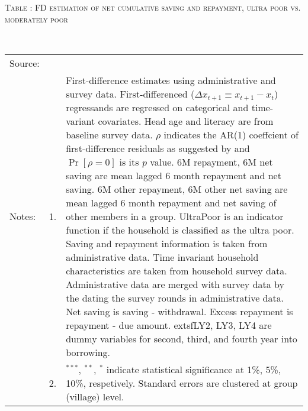 \hspace{-1cm}\begin{minipage}[t]{14cm}
\hfil\textsc{\normalsize Table \thetable: FD estimation of net cumulative saving and repayment, ultra poor vs. moderately poor\label{tab FD saving2 original HH}}\\
\setlength{\tabcolsep}{1pt}
\setlength{\baselineskip}{8pt}
\renewcommand{\arraystretch}{.55}
\hspace{-.75cm}\\
\renewcommand{\arraystretch}{.8}
\setlength{\tabcolsep}{1pt}
\begin{tabular}{>{\hfill\scriptsize}p{1cm}<{}>{\hfill\scriptsize}p{.25cm}<{}>{\scriptsize}p{12cm}<{\hfill}}
Source:& \multicolumn{2}{l}{\scriptsize Estimated with GUK administrative and survey data.}\\
Notes: & 1. & First-difference estimates using administrative and survey data. First-differenced ($\Delta x_{t+1}\equiv x_{t+1} - x_{t}$) regressands are regressed on categorical and time-variant covariates. Head age and literacy are from baseline survey data. $\rho$ indicates the AR(1) coeffcient of first-difference residuals as suggested by \citet[][10.71]{Wooldridge2010} and $\Pr[\rho=0]$ is its $p$ value. \textsf{6M repayment, 6M net saving} are mean lagged 6 month repayment and net saving. \textsf{6M other repayment, 6M other net saving} are mean lagged 6 month repayment and net saving of other members in a group. \textsf{UltraPoor} is an indicator function if the household is classified as the ultra poor. Saving and repayment information is taken from administrative data. Time invariant household characteristics are taken from household survey data. Administrative data are merged with survey data by the dating the survey rounds in administrative data. Net saving is saving - withdrawal. Excess repayment is repayment - due amount. 	extsf{LY2, LY3, LY4} are dummy variables for second, third, and fourth year into borrowing.\\
& 2. & ${}^{***}$, ${}^{**}$, ${}^{*}$ indicate statistical significance at 1\%, 5\%, 10\%, respetively. Standard errors are clustered at group (village) level.
\end{tabular}
\end{minipage}

